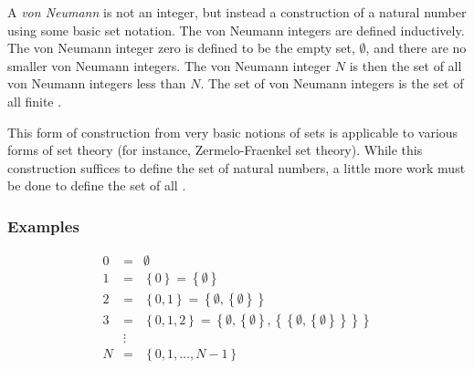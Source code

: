 \documentclass[12pt]{article}
\begin{document}
A \emph{von Neumann } is not an integer, but instead a construction of a natural number using some basic set notation.  The von Neumann integers are defined inductively.  The von Neumann integer zero is defined to be the empty set, $\emptyset$, and there are no smaller von Neumann integers.
The von Neumann integer $N$ is then the set of all von Neumann integers less than $N$.  The set of von Neumann integers is the set of all finite .

This form of construction from very basic notions of sets is applicable to various forms of set theory (for instance, Zermelo-Fraenkel set theory).  While this construction suffices to define the set of natural numbers, a little more work must be done to define the set of all .

\subsubsection*{Examples}

\begin{eqnarray*}
0 & = & \emptyset \\
1 & = & \left\{ 0 \right\} = \left\{ \emptyset \right\} \\
2 & = & \left\{ 0, 1 \right\} = \left\{ \emptyset, \left\{ \emptyset \right\} \right\} \\
3 & = & \left\{ 0, 1, 2 \right\} = \left\{ \emptyset, \left\{ \emptyset \right\}, \left\{ \left\{ \emptyset, \left\{ \emptyset \right\} \right\} \right\}\right\} \\
  & \vdots & \\
N & = & \left\{ 0, 1, \dots, N-1 \right\}
\end{eqnarray*}
\end{document}
